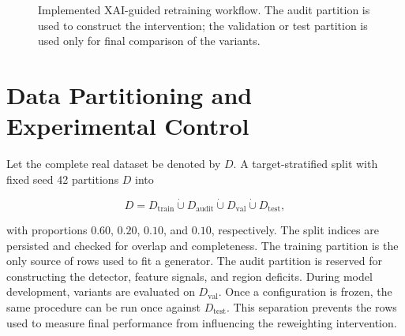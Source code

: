 \begin{figure}[htbp]
    \caption{Implemented XAI-guided retraining workflow. The audit partition is
    used to construct the intervention; the validation or test partition is
    used only for final comparison of the variants.}
    \label{fig:methodology_workflow}
\end{figure}

\section{Data Partitioning and Experimental Control}
\label{sec:data_partitioning}

Let the complete real dataset be denoted by $D$. A target-stratified split with
fixed seed 42 partitions $D$ into

\begin{equation}
    D = D_{\mathrm{train}} \mathbin{\dot\cup} D_{\mathrm{audit}}
        \mathbin{\dot\cup} D_{\mathrm{val}} \mathbin{\dot\cup} D_{\mathrm{test}},
\end{equation}

with proportions $0.60$, $0.20$, $0.10$, and $0.10$, respectively. The split
indices are persisted and checked for overlap and completeness. The training
partition is the only source of rows used to fit a generator. The audit
partition is reserved for constructing the detector, feature signals, and
region deficits. During model development, variants are evaluated on
$D_{\mathrm{val}}$. Once a configuration is frozen, the same procedure can be
run once against $D_{\mathrm{test}}$. This separation prevents the rows used to
measure final performance from influencing the reweighting intervention.

